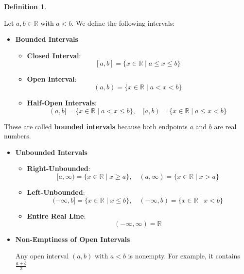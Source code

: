 \documentclass[
]{book}
\theoremstyle{definition}
\newtheorem{definition}{Definition}[chapter]
\theoremstyle{definition}
\theoremstyle{definition}
\theoremstyle{definition}
\theoremstyle{remark}
\begin{document}
\begin{definition}
\protect\hypertarget{def:unnamed-chunk-118}{}\label{def:unnamed-chunk-118}

Let \(a, b \in \mathbb{R}\) with \(a < b\). We define the following intervals:

\begin{itemize}
\item
  \textbf{Bounded Intervals}

  \begin{itemize}
  \item
    \textbf{Closed Interval}:
    \[
      [a, b] = \{ x \in \mathbb{R} \mid a \leq x \leq b \}
      \]
  \item
    \textbf{Open Interval}:
    \[
      (a, b) = \{ x \in \mathbb{R} \mid a < x < b \}
      \]
  \item
    \textbf{Half-Open Intervals}:
    \[
      (a, b] = \{ x \in \mathbb{R} \mid a < x \leq b \}, \quad [a, b) = \{ x \in \mathbb{R} \mid a \leq x < b \}
      \]
  \end{itemize}
\end{itemize}

These are called \textbf{bounded intervals} because both endpoints \(a\) and \(b\) are real numbers.

\begin{itemize}
\item
  \textbf{Unbounded Intervals}

  \begin{itemize}
  \item
    \textbf{Right-Unbounded}:
    \[
      [a, \infty) = \{ x \in \mathbb{R} \mid x \geq a \}, \quad (a, \infty) = \{ x \in \mathbb{R} \mid x > a \}
      \]
  \item
    \textbf{Left-Unbounded}:
    \[
      (-\infty, b] = \{ x \in \mathbb{R} \mid x \leq b \}, \quad (-\infty, b) = \{ x \in \mathbb{R} \mid x < b \}
      \]
  \item
    \textbf{Entire Real Line}:
    \[
      (-\infty, \infty) = \mathbb{R}
      \]
  \end{itemize}
\end{itemize}

\end{definition}

\begin{itemize}
\item
  \textbf{Non-Emptiness of Open Intervals}

  Any open interval \((a, b)\) with \(a < b\) is nonempty.
  For example, it contains \(\frac{a + b}{2}\)
\end{itemize}
\end{document}
